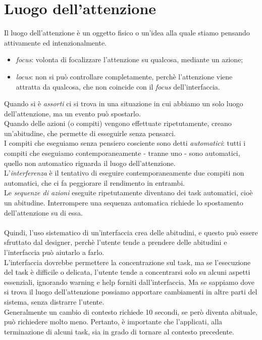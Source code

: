 \section{Luogo dell'attenzione}
Il luogo dell'attenzione è un oggetto fisico o un'idea alla quale stiamo pensando attivamente ed intenzionalmente.
\begin{itemize}
	\item \textit{focus}: volonta di focalizzare l'attenzione su qualcosa, mediante un azione;
	\item \textit{locus}: non si pu\`o controllare completamente, perch\`e l'attenzione viene attratta da qualcosa, che non coincide con il \textit{focus} dell'interfaccia.
\end{itemize}
Quando si \`e \textit{assorti} ci si trova in una situazione in cui abbiamo un solo luogo dell'attenzione, ma un evento pu\`o spostarlo. \\
Quando delle azioni (o compiti) vengono effettuate ripetutamente, creano un'abitudine, che permette di esseguirle senza pensarci. \\
I compiti che eseguiamo senza pensiero cosciente sono detti \textit{automatici}: tutti i compiti che eseguiamo contemporaneamente - tranne uno - sono automatici, quello non automatico riguarda il luogo dell'attenzione. \\
L'\textit{interferenza} \`e il tentativo di eseguire contemporaneamente due compiti non automatici, che ci fa peggiorare il rendimento in entrambi. \\
Le \textit{sequenze di azioni} eseguite ripetutamente diventano dei task automatici, cio\`e un abitudine. Interrompere una sequenza automatica richiede lo spostamento dell'attenzione su di essa. \\\\

Quindi, l'uso sistematico di un'interfaccia crea delle abitudini, e questo pu\`o essere sfruttato dal designer, perch\`e l'utente tende a prendere delle abitudini e l'interfaccia pu\`o aiutarlo a farlo. \\
L'interfaccia dovrebbe permettere la concentrazione sul task, ma se l'esecuzione del task \`e difficile o delicata, l'utente tende a concentrarsi solo su alcuni aspetti essenziali, ignorando warning e help forniti dall'interfaccia. Ma se sappiamo dove si trova il luogo dell'attenzione possiamo apportare cambiamenti in altre parti del sistema, senza distrarre l'utente. \\
Generalmente un cambio di contesto richiede 10 secondi, se per\`o diventa abituale, pu\`o richiedere molto meno. Pertanto, \`e importante che l'applicati, alla terminazione di alcuni task, sia in grado di tornare al contesto precedente.

